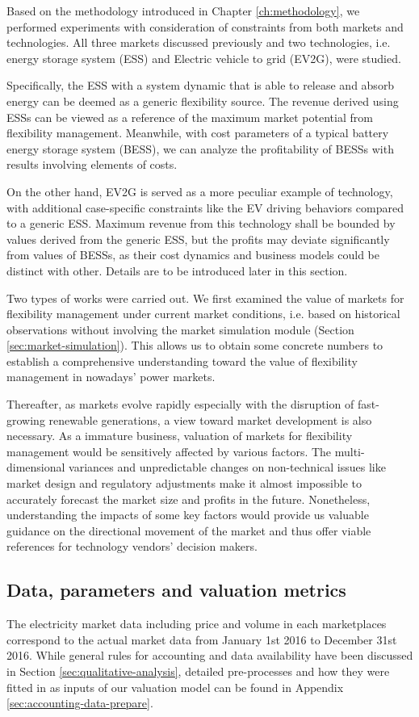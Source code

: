 Based on the methodology introduced in Chapter \ref{ch:methodology}, we performed experiments with consideration of constraints from both markets and technologies. All three markets discussed previously and two technologies, i.e. energy storage system (ESS) and Electric vehicle to grid (EV2G), were studied. 

Specifically, the ESS with a system dynamic that is able to release and absorb energy can be deemed as a generic flexibility source. The revenue derived using ESSs can be viewed as a reference of the maximum market potential from flexibility management. Meanwhile, with cost parameters of a typical battery energy storage system (BESS), we can analyze the profitability of BESSs with results involving elements of costs. 

On the other hand, EV2G is served as a more peculiar example of technology, with additional case-specific constraints like the EV driving behaviors compared to a generic ESS. Maximum revenue from this technology shall be bounded by values derived from the generic ESS, but the profits may deviate significantly from values of BESSs, as their cost dynamics and business models could be distinct with other. Details are to be introduced later in this section.

Two types of works were carried out. We first examined the value of markets for flexibility management under current market conditions, i.e. based on historical observations without involving the market simulation module (Section \ref{sec:market-simulation}). This allows us to obtain some concrete numbers to establish a comprehensive understanding toward the value of flexibility management in nowadays' power markets. 

Thereafter, as markets evolve rapidly especially with the disruption of fast-growing renewable generations, a view toward market development is also necessary. As a immature business, valuation of markets for flexibility management would be sensitively affected by various factors. The multi-dimensional variances and unpredictable changes on non-technical issues like market design and regulatory adjustments make it almost impossible to accurately forecast the market size and profits in the future. Nonetheless, understanding the impacts of some key factors would provide us valuable guidance on the directional movement of the market and thus offer viable references for technology vendors' decision makers.

\subsection{Data, parameters and valuation metrics}
The electricity market data including price and volume in each marketplaces correspond to the actual market data from January 1st 2016 to December 31st 2016. While general rules for accounting and data availability have been discussed in Section \ref{sec:qualitative-analysis}, detailed pre-processes and how they were fitted in as inputs of our valuation model can be found in Appendix \ref{sec:accounting-data-prepare}.

